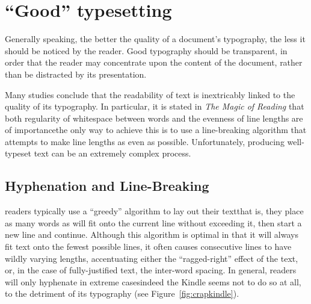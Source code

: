 \section{``Good'' typesetting}
\label{sec:goodtypesetting}

Generally speaking, the better the quality of a document's typography, the less it should be noticed by the reader. Good typography should be transparent, in order that the reader may concentrate upon the content of the document, rather than be distracted by its presentation.

Many studies\cite{Mittelbach1992,Hill1999,Bringhurst2008,Voorhees2011,Legge2011} conclude that the readability of text is inextricably linked to the quality of its typography. In particular, it is stated in \emph{The Magic of Reading}\cite{Hill1999} that both regularity of whitespace between words and the evenness of line lengths are of importance\ed the only way to achieve this is to use a line-breaking algorithm that attempts to make line lengths as even as possible. Unfortunately, producing well-typeset text can be an extremely complex process.\cite{Hurst2009}


\subsection{Hyphenation and Line-Breaking}
\Ebook{} readers typically use a ``greedy'' algorithm to lay out their text\ed that is, they place as many words as will fit onto the current line without exceeding it, then start a new line and continue. Although this algorithm is optimal in that it will always fit text onto the fewest possible lines, it often causes consecutive lines to have wildly varying lengths, accentuating either the ``ragged-right'' effect of the text, or, in the case of fully-justified text, the inter-word spacing. In general, \ebook{} readers will only hyphenate in extreme cases\ed indeed the Kindle seems not to do so at all, to the detriment of its typography (see Figure~\ref{fig:crapkindle}).

